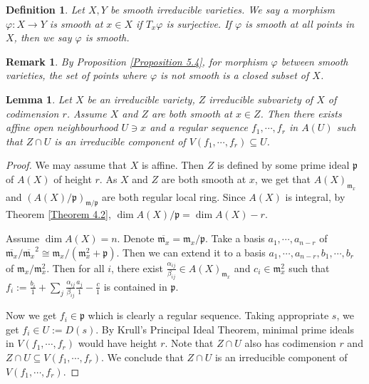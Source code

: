 \documentclass{ctexart}
\newtheorem{definition}{Definition}[section]
\newtheorem{remark}{Remark}[section]
\newtheorem{lemma}{Lemma}[section]
\begin{document}
\begin{definition}
    Let $X, Y$ be smooth irreducible varieties.
    We say a morphism $\varphi: X \rightarrow Y$ is smooth at $x\in X$ if $T_{x}\varphi$ is surjective.
    If $\varphi$ is smooth at all points in $X$, then we say $\varphi$ is smooth.
\end{definition}
\begin{remark}
    By Proposition \ref{Proposition 5.4}, for morphism $\varphi$ between smooth varieties, 
    the set of points where $\varphi$ is not smooth is a closed subset of $X$.
\end{remark}
\begin{lemma}
    Let $X$ be an irreducible variety, $Z$ irreducible subvariety of $X$ of codimension $r$.
    Assume $X$ and $Z$ are both smooth at $x\in Z$.
    Then there exists affine open neighbourhood $U\ni x$ and a regular sequence $f_{1}, \cdots, f_{r}$ in $A(U)$ such that $Z \cap U$ is an irreducible component of $V(f_{1}, \cdots, f_{r}) \subseteq U$.
    \label{Lemma 5.10}
\end{lemma}
\begin{proof}
    We may assume that $X$ is affine.
    Then $Z$ is defined by some prime ideal $\mathfrak{p}$ of $A(X)$ of height $r$.
    As $X$ and $Z$ are both smooth at $x$, we get that $A(X)_{\mathfrak{m}_{x}}$ and $(A(X)/\mathfrak{p})_{\mathfrak{m}/\mathfrak{p}}$ are both regular local ring.
    Since $A(X)$ is integral, by Theorem \ref{Theorem 4.2}, $\dim A(X)/\mathfrak{p} = \dim A(X) - r$.
    \par
    Assume $\dim A(X) = n$.
    Denote $\overline{\mathfrak{m}_{x}} = \mathfrak{m}_{x}/\mathfrak{p}$.
    Take a basis $a_{1}, \cdots, a_{n - r}$ of $\overline{\mathfrak{m}_{x}}/\overline{\mathfrak{m}_{x}}^{2} \cong \mathfrak{m}_{x}/(\mathfrak{m}_{x}^{2} + \mathfrak{p})$.
    Then we can extend it to a basis $a_{1}, \cdots, a_{n - r}, b_{1}, \cdots, b_{r}$ of $\mathfrak{m}_{x}/\mathfrak{m}_{x}^{2}$.
    Then for all $i$, there exist $\frac{\alpha_{ij}}{\beta_{ij}}\in A(X)_{\mathfrak{m}_{x}}$ and $c_{i}\in \mathfrak{m}_{x}^{2}$ such that $f_{i} := \frac{b_{i}}{1} + \sum_{j} \frac{\alpha_{ij}}{\beta_{ij}}\frac{a_{j}}{1} - \frac{c}{1}$ is contained in $\mathfrak{p}$.
    \par
    Now we get $f_{i}\in \mathfrak{p}$ which is clearly a regular sequence.
    Taking appropriate $s$, we get $f_{i}\in U := D(s)$.
    By Krull's Principal Ideal Theorem, minimal prime ideals in $V(f_{1}, \cdots, f_{r})$ would have height $r$.
    Note that $Z \cap U$ also has codimension $r$ and $Z \cap U \subseteq V(f_{1}, \cdots, f_{r})$.
    We conclude that $Z \cap U$ is an irreducible component of $V(f_{1}, \cdots, f_{r})$.
\end{proof}
\end{document}

